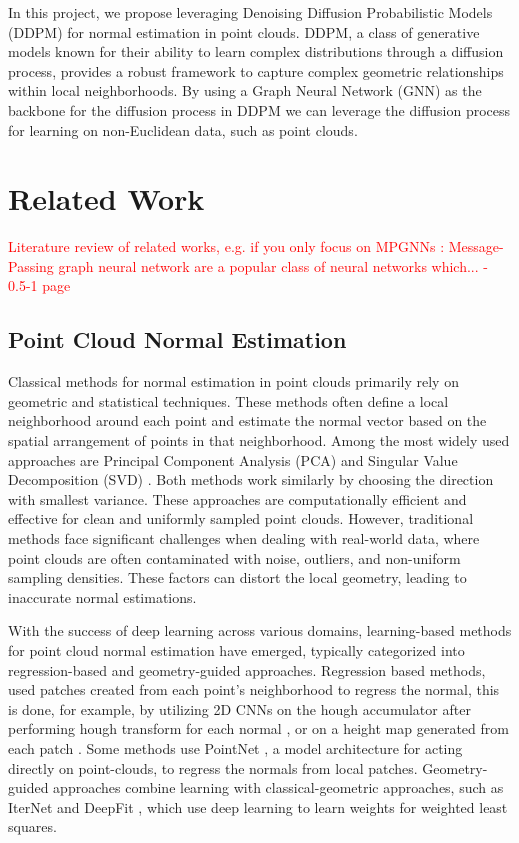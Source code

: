 \documentclass{acmart}
\begin{document}
In this project, we propose leveraging Denoising Diffusion Probabilistic Models (DDPM) \cite{ho2020denoising} for normal estimation in point clouds. DDPM, a class of generative models known for their ability to learn complex distributions through a diffusion process, provides a robust framework to capture complex geometric relationships within local neighborhoods. By using a Graph Neural Network (GNN) as the backbone for the diffusion process in DDPM we can leverage the diffusion process for learning on non-Euclidean data, such as point clouds.

\section{Related Work}
\textcolor{red}{Literature review of related works, e.g. if you only focus on MPGNNs : Message-Passing graph neural network are a popular class of neural networks which...\cite{morris2021weisfeiler} - 0.5-1 page}

\subsection{Point Cloud Normal Estimation}
Classical methods for normal estimation in point clouds primarily rely on geometric and statistical techniques. These methods often define a local neighborhood around each point and estimate the normal vector based on the spatial arrangement of points in that neighborhood. Among the most widely used approaches are Principal Component Analysis (PCA) \cite{hoppe1992surface} and Singular Value Decomposition (SVD) \cite{pauly2002efficient}.
Both methods work similarly by choosing the direction with smallest variance. These approaches are computationally efficient and effective for clean and uniformly sampled point clouds.
However, traditional methods face significant challenges when dealing with real-world data, where point clouds are often contaminated with noise, outliers, and non-uniform sampling densities. These factors can distort the local geometry, leading to inaccurate normal estimations.

With the success of deep learning across various domains, learning-based methods for point cloud normal estimation have emerged, typically categorized into regression-based and geometry-guided approaches.
Regression based methods, used patches created from each point's neighborhood to regress the normal, this is done, for example, by utilizing 2D CNNs on the hough accumulator after performing hough transform for each normal \cite{boulch2016deep}, or on a height map generated from each patch \cite{roveri2018pointpronets,zhou2022refine}. Some methods \cite{guerrero2018pcpnet,sharma2021point} use PointNet \cite{qi2017pointnet}, a model architecture for acting directly on point-clouds, to regress the normals from local patches. Geometry-guided approaches combine learning with classical-geometric approaches, such as IterNet \cite{lenssen2020deep} and DeepFit \cite{ben2020deepfit}, which use deep learning to learn weights for weighted least squares.
\end{document}
